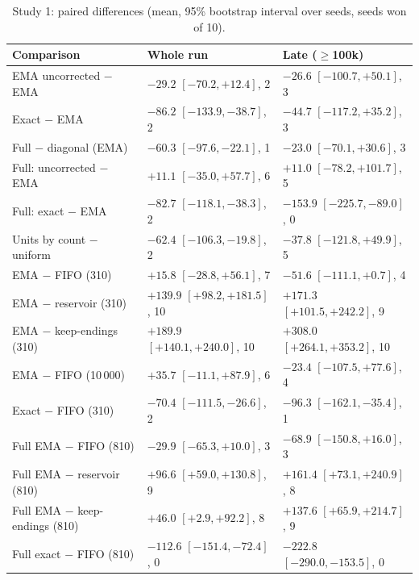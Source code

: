 \documentclass{article}
\begin{document}
\begin{table}[h]
\caption{Study 1: paired differences (mean, 95\% bootstrap interval over
seeds, seeds won of 10).}
\label{tab:pairs}
\centering
\small
\begin{tabular}{lll}
\toprule
Comparison & Whole run & Late ($\geq$100k) \\
\midrule
EMA uncorrected $-$ EMA & $-29.2$ $[-70.2, +12.4]$, 2 & $-26.6$ $[-100.7, +50.1]$, 3 \\
Exact $-$ EMA & $-86.2$ $[-133.9, -38.7]$, 2 & $-44.7$ $[-117.2, +35.2]$, 3 \\
Full $-$ diagonal (EMA) & $-60.3$ $[-97.6, -22.1]$, 1 & $-23.0$ $[-70.1, +30.6]$, 3 \\
Full: uncorrected $-$ EMA & $+11.1$ $[-35.0, +57.7]$, 6 & $+11.0$ $[-78.2, +101.7]$, 5 \\
Full: exact $-$ EMA & $-82.7$ $[-118.1, -38.3]$, 2 & $-153.9$ $[-225.7, -89.0]$, 0 \\
Units by count $-$ uniform & $-62.4$ $[-106.3, -19.8]$, 2 & $-37.8$ $[-121.8, +49.9]$, 5 \\
\midrule
EMA $-$ FIFO (310) & $+15.8$ $[-28.8, +56.1]$, 7 & $-51.6$ $[-111.1, +0.7]$, 4 \\
EMA $-$ reservoir (310) & $+139.9$ $[+98.2, +181.5]$, 10 & $+171.3$ $[+101.5, +242.2]$, 9 \\
EMA $-$ keep-endings (310) & $+189.9$ $[+140.1, +240.0]$, 10 & $+308.0$ $[+264.1, +353.2]$, 10 \\
EMA $-$ FIFO (10\,000) & $+35.7$ $[-11.1, +87.9]$, 6 & $-23.4$ $[-107.5, +77.6]$, 4 \\
Exact $-$ FIFO (310) & $-70.4$ $[-111.5, -26.6]$, 2 & $-96.3$ $[-162.1, -35.4]$, 1 \\
Full EMA $-$ FIFO (810) & $-29.9$ $[-65.3, +10.0]$, 3 & $-68.9$ $[-150.8, +16.0]$, 3 \\
Full EMA $-$ reservoir (810) & $+96.6$ $[+59.0, +130.8]$, 9 & $+161.4$ $[+73.1, +240.9]$, 8 \\
Full EMA $-$ keep-endings (810) & $+46.0$ $[+2.9, +92.2]$, 8 & $+137.6$ $[+65.9, +214.7]$, 9 \\
Full exact $-$ FIFO (810) & $-112.6$ $[-151.4, -72.4]$, 0 & $-222.8$ $[-290.0, -153.5]$, 0 \\
\bottomrule
\end{tabular}
\end{table}
\end{document}
